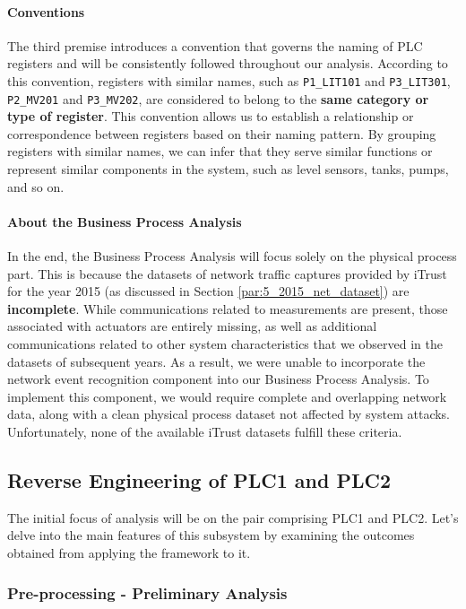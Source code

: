 \paragraph{Conventions}
\label{par:6_conventions}
The third premise introduces a convention that governs the naming of PLC registers and will be consistently followed throughout our analysis. According to this convention, registers with similar names, such as \texttt{P1\_LIT101} and \texttt{P3\_LIT301}, \texttt{P2\_MV201} and \texttt{P3\_MV202}, are considered to belong to the \textbf{same category or type of register}. This convention allows us to establish a relationship or correspondence between registers based on their naming pattern. By grouping registers with similar names, we can infer that they serve similar functions or represent similar components in the system, such as level sensors, tanks, pumps, and so on.

\paragraph{About the Business Process Analysis}
\label{par:6_premesse_bpa}
In the end, the Business Process Analysis will focus solely on the physical process part. This is because the datasets of network traffic captures provided by iTrust for the year 2015 (as discussed in Section \ref{par:5_2015_net_dataset}) are \textbf{incomplete}. While communications related to measurements are present, those associated with actuators are entirely missing, as well as additional communications related to other system characteristics that we observed in the datasets of subsequent years. As a result, we were unable to incorporate the network event recognition component into our Business Process Analysis. To implement this component, we would require complete and overlapping network data, along with a clean physical process dataset not affected by system attacks. Unfortunately, none of the available iTrust datasets fulfill these criteria.

\subsection{Reverse Engineering of PLC1 and PLC2}
\label{subsec:6_P1P2_analysis}
The initial focus of analysis will be on the pair comprising PLC1 and PLC2. Let's delve into the main features of this subsystem by examining the outcomes obtained from applying the framework to it.

\subsubsection{Pre-processing - Preliminary Analysis}
\label{subsubsec:6_P1P2_preprocessing}

